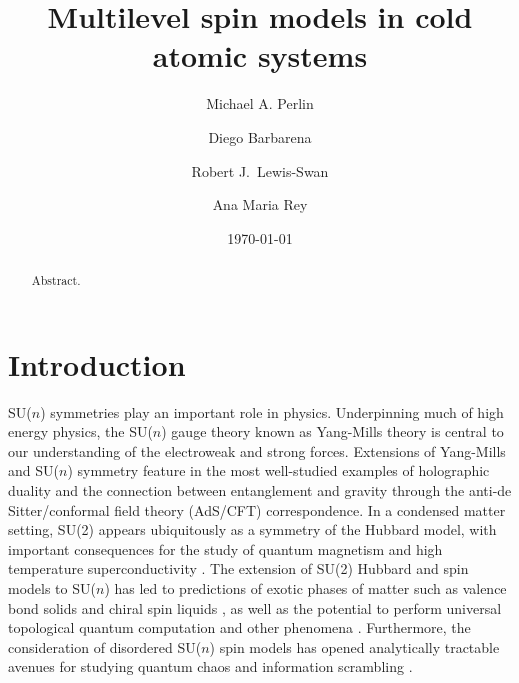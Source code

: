 \documentclass[nofootinbib,twocolumn]{revtex4-2}
\newcommand{\1}{\mathds{1}}
\begin{document}
\title{Multilevel spin models in cold atomic systems}
\author{Michael A. Perlin}
\author{Diego Barbarena}
\author{Robert J.~Lewis-Swan}
\author{Ana Maria Rey}

\date{\today}

\begin{abstract}
  Abstract.
\end{abstract}

\maketitle

\section{Introduction}
\label{sec:intro}

SU($n$) symmetries play an important role in physics.
Underpinning much of high energy physics, the SU($n$) gauge theory known as Yang-Mills theory is central to our understanding of the electroweak and strong forces.
Extensions of Yang-Mills and SU($n$) symmetry feature in the most well-studied examples of holographic duality \cite{maldacena1999largen} and the connection between entanglement and gravity \cite{ryu2006holographic} through the anti-de Sitter/conformal field theory (AdS/CFT) correspondence.
In a condensed matter setting, SU(2) appears ubiquitously as a symmetry of the Hubbard model, with important consequences for the study of quantum magnetism and high temperature superconductivity \cite{lee2006doping}.
The extension of SU(2) Hubbard and spin models to SU($n$) has led to predictions of exotic phases of matter such as valence bond solids \cite{read1989valencebond, rokhsar1990quadratic, kaul2012lattice, hermele2011topological} and chiral spin liquids \cite{hermele2009mott, hermele2011topological, chen2016syntheticgaugefield, nataf2016chiral}, as well as the potential to perform universal topological quantum computation \cite{freedman2004class, nayak2008nonabelian} and other phenomena \cite{nataf2014exact, nataf2016exact}.
Furthermore, the consideration of disordered SU($n$) spin models has opened analytically tractable avenues for studying quantum chaos and information scrambling \cite{sachdev1993gapless, bentsen2019integrable}.
\end{document}
